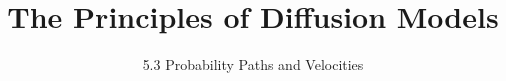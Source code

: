 
\title{The Principles of Diffusion Models}
\subtitle{5.3 Probability Paths and Velocities}


\begin{frame}
    \titlepage
\end{frame}


